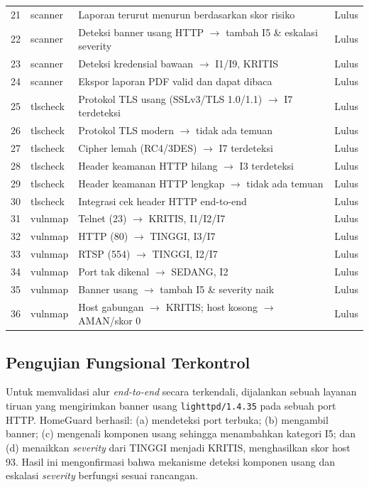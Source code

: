 \begin{table}[t]
\begin{tabular}{|c|l|l|c|}
        21 & scanner & Laporan terurut menurun berdasarkan skor risiko & Lulus \\
        22 & scanner & Deteksi banner usang HTTP $\rightarrow$ tambah I5 \& eskalasi severity & Lulus \\
        23 & scanner & Deteksi kredensial bawaan $\rightarrow$ I1/I9, KRITIS & Lulus \\
        24 & scanner & Ekspor laporan PDF valid dan dapat dibaca & Lulus \\
        25 & tlscheck & Protokol TLS usang (SSLv3/TLS 1.0/1.1) $\rightarrow$ I7 terdeteksi & Lulus \\
        26 & tlscheck & Protokol TLS modern $\rightarrow$ tidak ada temuan & Lulus \\
        27 & tlscheck & Cipher lemah (RC4/3DES) $\rightarrow$ I7 terdeteksi & Lulus \\
        28 & tlscheck & Header keamanan HTTP hilang $\rightarrow$ I3 terdeteksi & Lulus \\
        29 & tlscheck & Header keamanan HTTP lengkap $\rightarrow$ tidak ada temuan & Lulus \\
        30 & tlscheck & Integrasi cek header HTTP end-to-end & Lulus \\
        31 & vulnmap & Telnet (23) $\rightarrow$ KRITIS, I1/I2/I7 & Lulus \\
        32 & vulnmap & HTTP (80) $\rightarrow$ TINGGI, I3/I7 & Lulus \\
        33 & vulnmap & RTSP (554) $\rightarrow$ TINGGI, I2/I7 & Lulus \\
        34 & vulnmap & Port tak dikenal $\rightarrow$ SEDANG, I2 & Lulus \\
        35 & vulnmap & Banner usang $\rightarrow$ tambah I5 \& severity naik & Lulus \\
        36 & vulnmap & Host gabungan $\rightarrow$ KRITIS; host kosong $\rightarrow$ AMAN/skor 0 & Lulus \\
        \hline
    \end{tabular}
\end{table}

\subsection{Pengujian Fungsional Terkontrol}
Untuk memvalidasi alur \textit{end-to-end} secara terkendali, dijalankan
sebuah layanan tiruan yang mengirimkan banner usang
\texttt{lighttpd/1.4.35} pada sebuah port HTTP. HomeGuard berhasil:
(a) mendeteksi port terbuka; (b) mengambil banner; (c) mengenali komponen
usang sehingga menambahkan kategori I5; dan (d) menaikkan \textit{severity}
dari TINGGI menjadi KRITIS, menghasilkan skor host 93. Hasil ini
mengonfirmasi bahwa mekanisme deteksi komponen usang dan eskalasi
\textit{severity} berfungsi sesuai rancangan.

